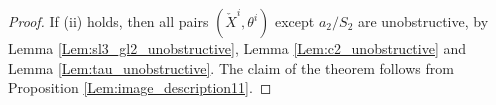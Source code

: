 \documentclass[12pt]{amsart}
\newcommand{\C}{\mathbb{C}}
\newcommand{\A}{\mathcal{A}}
\newcommand{\Orb}{\mathbb{O}}
\newcommand{\gr}{\operatorname{gr}}
\newcommand{\kf}{\mathfrak{k}}
\newcommand{\HC}{\operatorname{HC}}
\newcommand{\slf}{\mathfrak{sl}}
\newcommand{\param}{\mathfrak{P}}
\theoremstyle{definition}
\numberwithin{equation}{section}
\begin{document}
\begin{proof}
If (ii) holds, then all pairs $(\check{X}^i,\theta^i)$ except $a_2/S_2$ are unobstructive, by Lemma
\ref{Lem:sl3_gl2_unobstructive}, Lemma \ref{Lem:c2_unobstructive} and Lemma \ref{Lem:tau_unobstructive}.
The claim of the theorem follows from Proposition \ref{Lem:image_description11}.

\end{proof}
\end{document}
